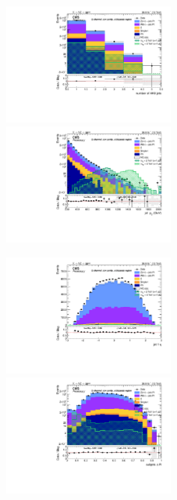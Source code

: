 \begin{figure}[!htb]
  \begin{center}
    \includegraphics[width=0.495\textwidth]{plots/v9_U/XVZnnlpSB/nFatJets.pdf}  
    \includegraphics[width=0.495\textwidth]{plots/v9_U/XVZnnlpSB/FatJet1_pt.pdf}
    
    \includegraphics[width=0.495\textwidth]{plots/v9_U/XVZnnlpSB/FatJet1_eta.pdf}
    \includegraphics[width=0.495\textwidth]{plots/v9_U/XVZnnlpSB/FatJet1_dR.pdf}


\end{center}
\end{figure}
